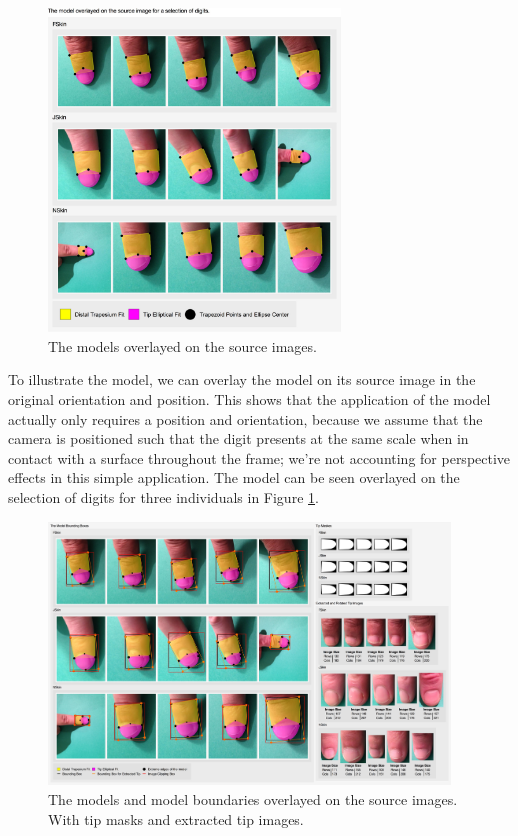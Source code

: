 \begin{figure}[h!]
  \centering
    \includegraphics[width=0.69\textwidth]{Chapter4/Figs/Model_Overlayed.jpg}
    \caption{The models overlayed on the source images.}\label{fig:FingertipModelResult}
\end{figure}

To illustrate the model, we can overlay the model on its source image in the original orientation and position. This shows that the application of the model actually only requires a position and orientation, because we assume that the camera is positioned such that the digit presents at the same scale when in contact with a surface throughout the frame; we're not accounting for perspective effects in this simple application.
The model can be seen overlayed on the selection of digits for three individuals in Figure \ref{fig:FingertipModelResult}.


\begin{figure}
  \centering
    \includegraphics[width=0.95\textwidth]{Chapter4/Figs/Model_Overlayed_Boundary_with_Tips.jpg}
    \caption{The models and model boundaries overlayed on the source images. With tip masks and extracted tip images.}\label{fig:ModelOverlayedBoundaryWithTips}
\end{figure}


